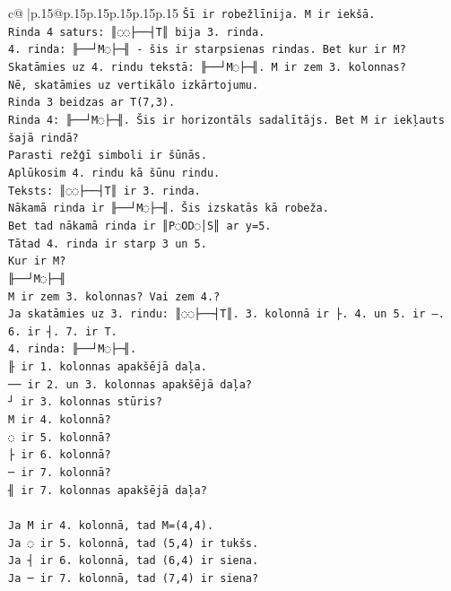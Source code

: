 \documentclass{article}
\begin{document}
{\begin{supertabular}{c@{$\;$}|p{.15\linewidth}@{}p{.15\linewidth}p{.15\linewidth}p{.15\linewidth}p{.15\linewidth}p{.15\linewidth}}
{{{\texttt{Šī ir robežlīnija. M ir iekšā.} \\
\texttt{Rinda 4 saturs: ║◌◌├──┤T║ bija 3. rinda.} \\
\texttt{4. rinda: ╟──┘M◌├─╢ {-} šis ir starpsienas rindas. Bet kur ir M?} \\
\texttt{Skatāmies uz 4. rindu tekstā: ╟──┘M◌├─╢. M ir zem 3. kolonnas?} \\
\texttt{Nē, skatāmies uz vertikālo izkārtojumu.} \\
\texttt{Rinda 3 beidzas ar T(7,3).} \\
\texttt{Rinda 4: ╟──┘M◌├─╢. Šis ir horizontāls sadalītājs. Bet M ir iekļauts šajā rindā?} \\
\texttt{Parasti režģī simboli ir šūnās.} \\
\texttt{Aplūkosim 4. rindu kā šūnu rindu.} \\
\texttt{Teksts: ║◌◌├──┤T║ ir 3. rinda.} \\
\texttt{Nākamā rinda ir ╟──┘M◌├─╢. Šis izskatās kā robeža.} \\
\texttt{Bet tad nākamā rinda ir ║P◌OD◌│S║ ar y=5.} \\
\texttt{Tātad 4. rinda ir starp 3 un 5.} \\
\texttt{Kur ir M?} \\
\texttt{╟──┘M◌├─╢} \\
\texttt{M ir zem 3. kolonnas? Vai zem 4.?} \\
\texttt{Ja skatāmies uz 3. rindu: ║◌◌├──┤T║. 3. kolonnā ir ├. 4. un 5. ir –. 6. ir ┤. 7. ir T.} \\
\texttt{4. rinda: ╟──┘M◌├─╢.} \\
\texttt{╟ ir 1. kolonnas apakšējā daļa.} \\
\texttt{── ir 2. un 3. kolonnas apakšējā daļa?} \\
\texttt{┘ ir 3. kolonnas stūris?} \\
\texttt{M ir 4. kolonnā?} \\
\texttt{◌ ir 5. kolonnā?} \\
\texttt{├ ir 6. kolonnā?} \\
\texttt{─ ir 7. kolonnā?} \\
\texttt{╢ ir 7. kolonnas apakšējā daļa?} \\
\\ 
\texttt{Ja M ir 4. kolonnā, tad M=(4,4).} \\
\texttt{Ja ◌ ir 5. kolonnā, tad (5,4) ir tukšs.} \\
\texttt{Ja ┤ ir 6. kolonnā, tad (6,4) ir siena.} \\
\texttt{Ja ─ ir 7. kolonnā, tad (7,4) ir siena?} \\
}}}
\end{supertabular}}
\end{document}
